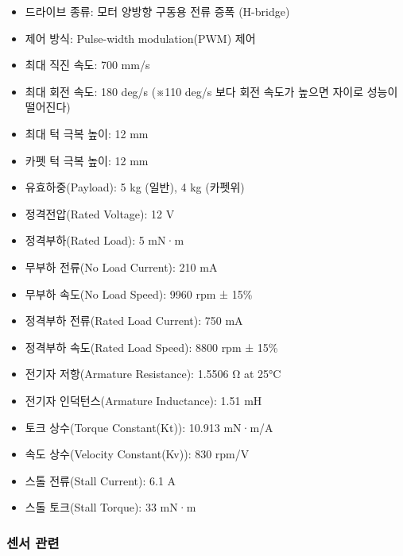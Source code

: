 \begin{itemize}[leftmargin=*]
\item 드라이브 종류: 모터 양방향 구동용 전류 증폭 (H-bridge)
\item 제어 방식: Pulse-width modulation(PWM) 제어
\item 최대 직진 속도: 700 mm/s
\item 최대 회전 속도: 180 deg/s (※110 deg/s 보다 회전 속도가 높으면 자이로 성능이 떨어진다)
\item 최대 턱 극복 높이: 12 mm
\item 카펫 턱 극복 높이: 12 mm
\item 유효하중(Payload): 5 kg (일반), 4 kg (카펫위)
\end{itemize}

\begin{itemize}[leftmargin=*]
\item 정격전압(Rated Voltage): 12 V
\item 정격부하(Rated Load): 5 mN·m
\item 무부하 전류(No Load Current): 210 mA
\item 무부하 속도(No Load Speed): 9960 rpm ± 15\%
\item 정격부하 전류(Rated Load Current): 750 mA
\item 정격부하 속도(Rated Load Speed): 8800 rpm ± 15\%
\item 전기자 저항(Armature Resistance): 1.5506 Ω at 25°C
\item 전기자 인덕턴스(Armature Inductance): 1.51 mH
\item 토크 상수(Torque Constant(Kt)): 10.913 mN·m/A
\item 속도 상수(Velocity Constant(Kv)): 830 rpm/V
\item 스톨 전류(Stall Current): 6.1 A
\item 스톨 토크(Stall Torque): 33 mN·m
\end{itemize}

\subsubsection{센서 관련}

